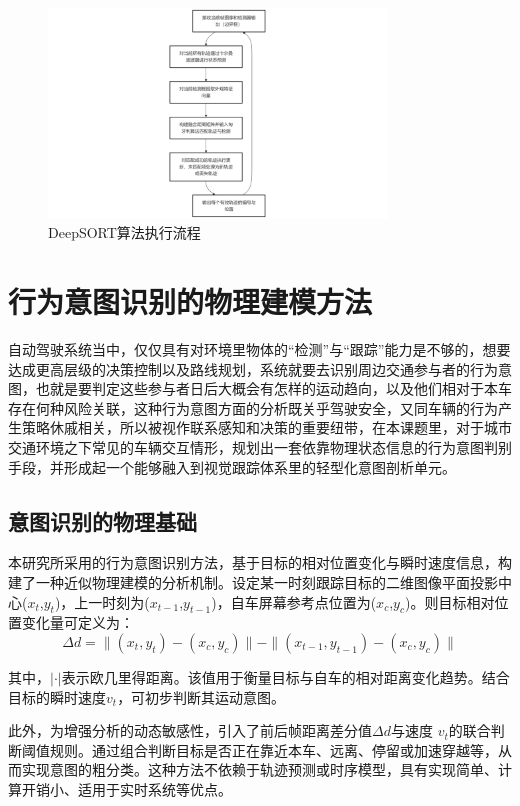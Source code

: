 \begin{figure}[H]
    \centering
    \includegraphics[width=0.8\textwidth]{images/图2 DeepSORT算法执行流程.pdf}  %
    \caption{DeepSORT算法执行流程}
    \label{fig:example_image}  %
\end{figure}

\section{行为意图识别的物理建模方法}

自动驾驶系统当中，仅仅具有对环境里物体的“检测”与“跟踪”能力是不够的，想要达成更高层级的决策控制以及路线规划，系统就要去识别周边交通参与者的行为意图，也就是要判定这些参与者日后大概会有怎样的运动趋向，以及他们相对于本车存在何种风险关联，这种行为意图方面的分析既关乎驾驶安全，又同车辆的行为产生策略休戚相关，所以被视作联系感知和决策的重要纽带，在本课题里，对于城市交通环境之下常见的车辆交互情形，规划出一套依靠物理状态信息的行为意图判别手段，并形成起一个能够融入到视觉跟踪体系里的轻型化意图剖析单元。

\subsection{意图识别的物理基础}

本研究所采用的行为意图识别方法，基于目标的相对位置变化与瞬时速度信息，构建了一种近似物理建模的分析机制。设定某一时刻跟踪目标的二维图像平面投影中心($x_t$,$y_t$)，上一时刻为($x_{t-1}$,$y_{t-1}$)，自车屏幕参考点位置为($x_c$,$y_c$)。则目标相对位置变化量可定义为：
\[\Delta d = \|(x_t, y_t) - (x_c, y_c)\| - \|(x_{t - 1}, y_{t - 1}) - (x_c, y_c)\|\]

其中，$\left| \cdot \right|$表示欧几里得距离。该值用于衡量目标与自车的相对距离变化趋势。结合目标的瞬时速度$v_t$，可初步判断其运动意图。

此外，为增强分析的动态敏感性，引入了前后帧距离差分值$\Delta d$与速度 $v_t$的联合判断阈值规则。通过组合判断目标是否正在靠近本车、远离、停留或加速穿越等，从而实现意图的粗分类。这种方法不依赖于轨迹预测或时序模型，具有实现简单、计算开销小、适用于实时系统等优点。

